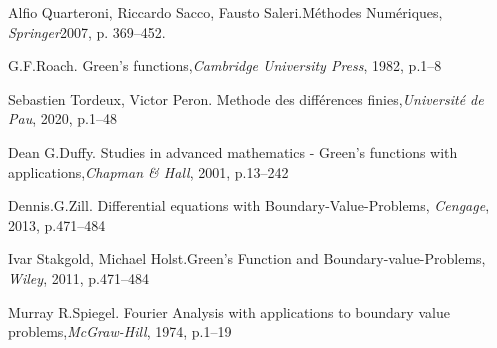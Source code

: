\documentclass[10pt]{article}
\begin{document}
	
\begin{thebibliography}{Bibliographie}
 
 Alfio Quarteroni, Riccardo Sacco, Fausto Saleri.Méthodes Numériques, \emph{Springer}2007, p. 369--452.


G.F.Roach. Green's functions,\emph{Cambridge University Press}, 1982, p.1--8

Sebastien Tordeux, Victor Peron. Methode des différences finies,\emph{Université de Pau}, 2020, p.1--48

Dean G.Duffy. Studies in advanced mathematics - Green's functions with applications,\emph{Chapman \& Hall}, 2001, p.13--242

Dennis.G.Zill. Differential equations with Boundary-Value-Problems, \emph{Cengage}, 2013, p.471--484

Ivar Stakgold, Michael Holst.Green's Function and Boundary-value-Problems, \emph{Wiley}, 2011, p.471--484 %

Murray R.Spiegel. Fourier Analysis with applications to boundary value problems,\emph{McGraw-Hill}, 1974, p.1--19 %
  
 \end{thebibliography}
\end{document}

